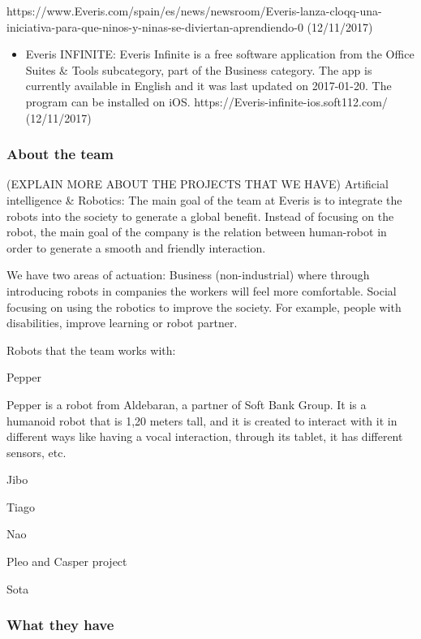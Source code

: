 \documentclass[]{article}
\providecommand{\tightlist}{%
  \setlength{\itemsep}{0pt}\setlength{\parskip}{0pt}}
\begin{document}
https://www.Everis.com/spain/es/news/newsroom/Everis-lanza-cloqq-una-iniciativa-para-que-ninos-y-ninas-se-diviertan-aprendiendo-0
(12/11/2017)

\begin{itemize}
\tightlist
\item
  Everis INFINITE: Everis Infinite is a free software application from
  the Office Suites \& Tools subcategory, part of the Business category.
  The app is currently available in English and it was last updated on
  2017-01-20. The program can be installed on iOS.
  https://Everis-infinite-ios.soft112.com/ (12/11/2017)
\end{itemize}

\hypertarget{about-the-team}{%
\subsubsection{About the team}\label{about-the-team}}

(EXPLAIN MORE ABOUT THE PROJECTS THAT WE HAVE) Artificial intelligence
\& Robotics: The main goal of the team at Everis is to integrate the
robots into the society to generate a global benefit. Instead of
focusing on the robot, the main goal of the company is the relation
between human-robot in order to generate a smooth and friendly
interaction.

We have two areas of actuation: Business (non-industrial) where through
introducing robots in companies the workers will feel more comfortable.
Social focusing on using the robotics to improve the society. For
example, people with disabilities, improve learning or robot partner.

Robots that the team works with:

Pepper

Pepper is a robot from Aldebaran, a partner of Soft Bank Group. It is a
humanoid robot that is 1,20 meters tall, and it is created to interact
with it in different ways like having a vocal interaction, through its
tablet, it has different sensors, etc.

Jibo

Tiago

Nao

Pleo and Casper project

Sota

\hypertarget{what-they-have}{%
\subsubsection{What they have}\label{what-they-have}}
\end{document}
